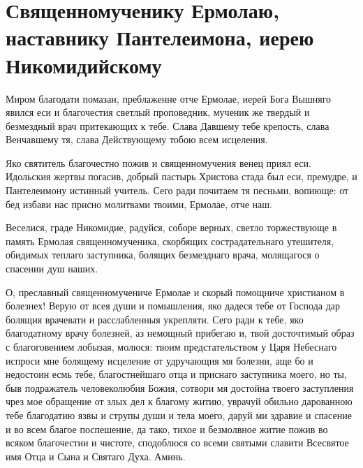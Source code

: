 \section{Священномученику Ермолаю, наставнику Пантелеимона, иерею Никомидийскому}\begin{mymulticols}


Миром благодати помазан, преблаженне отче Ермолае, иерей Бога Вышняго явился еси и благочестия светлый проповедник, мученик же твердый и безмездный врач притекающих к тебе. Слава Давшему тебе крепость, слава Венчавшему тя, слава Действующему тобою всем исцеления.


Яко святитель благочестно пожив и священномучения венец приял еси. Идольския жертвы погасив, добрый пастырь Христова стада был еси, премудре, и Пантелеимону истинный учитель. Сего ради почитаем тя песньми, вопиюще: от бед избави нас присно молитвами твоими, Ермолае, отче наш.


Веселися, граде Никомидие, радуйся, соборе верных, светло торжествующе в память Ермолая священномученика, скорбящих сострадательнаго утешителя, обидимых теплаго заступника, болящих безмезднаго врача, молящагося о спасении душ наших.


О, преславный священномучениче Ермолае и скорый помощниче христианом в болезнех! Верую от всея души и помышления, яко дадеся тебе от Господа дар болящия врачевати и расслабленныя укрепляти. Сего ради к тебе, яко благодатному врачу болезней, аз немощный прибегаю и, твой досточтимый образ с благоговением лобызая, молюся: твоим предстательством у Царя Небеснаго испроси мне болящему исцеление от удручающия мя болезни, аще бо и недостоин есмь тебе, благостнейшаго отца и приснаго заступника моего, но ты, быв подражатель человеколюбия Божия, сотвори мя достойна твоего заступления чрез мое обращение от злых дел к благому житию, уврачуй обильно дарованною тебе благодатию язвы и струпы души и тела моего, даруй ми здравие и спасение и во всем благое поспешение, да тако, тихое и безмолвное житие пожив во всяком благочестии и чистоте, сподоблюся со всеми святыми славити Всесвятое имя Отца и Сына и Святаго Духа. Аминь.

\end{mymulticols}

